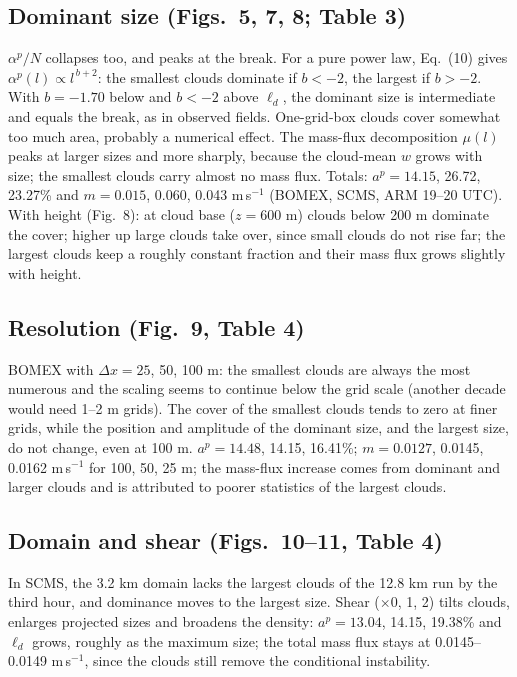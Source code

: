 \documentclass[10pt,a4paper]{article}
\begin{document}
\subsection{Dominant size (Figs.\ 5, 7, 8; Table 3)} $\alpha^p/N$ collapses too, and peaks at the break. For a pure power law, Eq.\ (10) gives $\alpha^p(l)\propto l^{\,b+2}$: the smallest clouds dominate if $b<-2$, the largest if $b>-2$. With $b=-1.70$ below and $b<-2$ above $\ell_d$, the dominant size is intermediate and equals the break, as in observed fields. One-grid-box clouds cover somewhat too much area, probably a numerical effect. The mass-flux decomposition $\mu(l)$ peaks at larger sizes and more sharply, because the cloud-mean $w$ grows with size; the smallest clouds carry almost no mass flux. Totals: $a^p=14.15$, 26.72, 23.27\% and $m=0.015$, 0.060, 0.043 m\,s$^{-1}$ (BOMEX, SCMS, ARM 19--20 UTC). With height (Fig.\ 8): at cloud base ($z=600$ m) clouds below 200 m dominate the cover; higher up large clouds take over, since small clouds do not rise far; the largest clouds keep a roughly constant fraction and their mass flux grows slightly with height.

\subsection{Resolution (Fig.\ 9, Table 4)} BOMEX with $\Delta x=25$, 50, 100 m: the smallest clouds are always the most numerous and the scaling seems to continue below the grid scale (another decade would need 1--2 m grids). The cover of the smallest clouds tends to zero at finer grids, while the position and amplitude of the dominant size, and the largest size, do not change, even at 100 m. $a^p=14.48$, 14.15, 16.41\%; $m=0.0127$, 0.0145, 0.0162 m\,s$^{-1}$ for 100, 50, 25 m; the mass-flux increase comes from dominant and larger clouds and is attributed to poorer statistics of the largest clouds.

\subsection{Domain and shear (Figs.\ 10--11, Table 4)} In SCMS, the 3.2 km domain lacks the largest clouds of the 12.8 km run by the third hour, and dominance moves to the largest size. Shear ($\times0$, 1, 2) tilts clouds, enlarges projected sizes and broadens the density: $a^p=13.04$, 14.15, 19.38\% and $\ell_d$ grows, roughly as the maximum size; the total mass flux stays at 0.0145--0.0149 m\,s$^{-1}$, since the clouds still remove the conditional instability.
\end{document}
